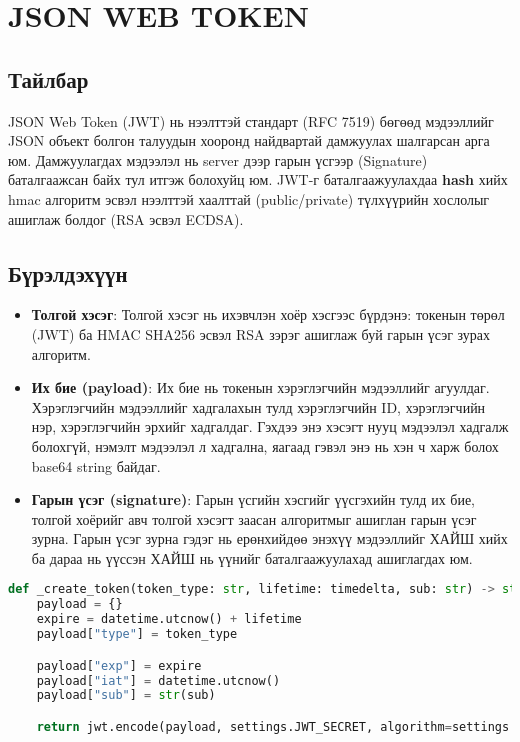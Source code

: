 \section{JSON WEB TOKEN}
\subsection{Тайлбар}
JSON Web Token (JWT) нь нээлттэй стандарт (RFC 7519) бөгөөд мэдээллийг JSON объект болгон талуудын хооронд найдвартай дамжуулах шалгарсан арга юм. Дамжуулагдах мэдээлэл нь server дээр гарын үсгээр (Signature) баталгаажсан байх тул итгэж болохуйц юм. JWT-г баталгаажуулахдаа \textbf{hash} хийх hmac алгоритм эсвэл нээлттэй хаалттай (public/private) түлхүүрийн хослолыг ашиглаж болдог (RSA эсвэл ECDSA).

\subsection{Бүрэлдэхүүн}
\begin{itemize}
	\item \textbf{Толгой хэсэг}: Толгой хэсэг нь ихэвчлэн хоёр хэсгээс бүрдэнэ: токенын төрөл (JWT) ба HMAC SHA256 эсвэл RSA зэрэг ашиглаж буй гарын үсэг зурах алгоритм.
	\item \textbf{Их бие (payload)}: Их бие нь токенын хэрэглэгчийн мэдээллийг агуулдаг. Хэрэглэгчийн мэдээллийг хадгалахын тулд хэрэглэгчийн ID, хэрэглэгчийн нэр, хэрэглэгчийн эрхийг хадгалдаг. Гэхдээ энэ хэсэгт нууц мэдээлэл хадгалж болохгүй, нэмэлт мэдээлэл л хадгална, яагаад гэвэл энэ нь хэн ч харж болох base64 string байдаг.
	\item \textbf{Гарын үсэг (signature)}: Гарын үсгийн хэсгийг үүсгэхийн тулд их бие, толгой хоёрийг авч толгой хэсэгт заасан алгоритмыг ашиглан гарын үсэг зурна. Гарын үсэг зурна гэдэг нь ерөнхийдөө энэхүү мэдээллийг ХАЙШ хийх ба дараа нь үүссэн ХАЙШ нь үүнийг баталгаажуулахад ашиглагдах юм.
\end{itemize}

\begin{lstlisting}[language=Python,caption={JWT олгох код},frame=single]
	def _create_token(token_type: str, lifetime: timedelta, sub: str) -> str:
	payload = {}
	expire = datetime.utcnow() + lifetime
	payload["type"] = token_type

	payload["exp"] = expire
	payload["iat"] = datetime.utcnow()
	payload["sub"] = str(sub)

	return jwt.encode(payload, settings.JWT_SECRET, algorithm=settings.ALGORITHM)

\end{lstlisting}

